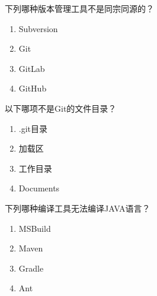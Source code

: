 \begin{problem}
	下列哪种版本管理工具不是同宗同源的？
    \vspace{-0.8em}
    \begin{multicols}{4}
        \begin{enumerate}[label=\Alph*.]
            \item Subversion
            \item Git
            \item GitLab
            \item GitHub
        \end{enumerate}
    \end{multicols}
    \vspace{-1em}
\end{problem}


\begin{problem}
	以下哪项不是Git的文件目录？
    \vspace{-0.8em}
    \begin{multicols}{4}
        \begin{enumerate}[label=\Alph*.]
            \item .git目录
            \item 加载区
            \item 工作目录
            \item Documents
        \end{enumerate}
    \end{multicols}
    \vspace{-1em}
\end{problem}


\begin{problem}
	下列哪种编译工具无法编译JAVA语言？
    \vspace{-0.8em}
    \begin{multicols}{4}
        \begin{enumerate}[label=\Alph*.]
            \item MSBuild
            \item Maven
            \item Gradle
            \item Ant
        \end{enumerate}
    \end{multicols}
    \vspace{-1em}
\end{problem}


